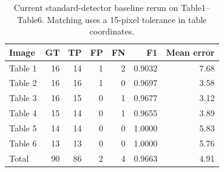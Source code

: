 \begin{table}[htbp]
\centering
\caption{Current standard-detector baseline rerun on Table1--Table6. Matching uses a 15-pixel tolerance in table coordinates.}
\label{tab:detection-results}
\begin{tabular}{lrrrrrr}
\toprule
Image & GT & TP & FP & FN & F1 & Mean error \\
\midrule
Table 1 & 16 & 14 & 1 & 2 & 0.9032 & 7.68 \\
Table 2 & 16 & 16 & 1 & 0 & 0.9697 & 3.58 \\
Table 3 & 16 & 15 & 0 & 1 & 0.9677 & 3.12 \\
Table 4 & 15 & 14 & 0 & 1 & 0.9655 & 3.89 \\
Table 5 & 14 & 14 & 0 & 0 & 1.0000 & 5.83 \\
Table 6 & 13 & 13 & 0 & 0 & 1.0000 & 5.76 \\
\midrule
Total & 90 & 86 & 2 & 4 & 0.9663 & 4.91 \\
\bottomrule
\end{tabular}
\end{table}
\FloatBarrier
